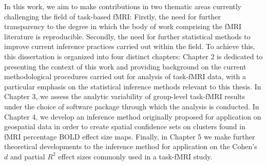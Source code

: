\noindent In this work, we aim to make contributions in two thematic areas currently challenging the field of task-based fMRI: Firstly, the need for further transparency to the degree in which the body of work comprising the fMRI literature is reproducible. Secondly, the need for further statistical methods to improve current inference practices carried out within the field. To achieve this, this dissertation is organized into four distinct chapters: Chapter 2 is dedicated to presenting the context of this work and providing background on the current methodological procedures carried out for analysis of task-fMRI data, with a particular emphasis on the statistical inference methods relevant to this thesis. In Chapter 3, we assess the analytic variability of group-level task-fMRI results under the choice of software package through which the analysis is conducted. In Chapter 4, we develop an inference method originally proposed for application on geospatial data in order to create spatial confidence sets on clusters found in fMRI percentage BOLD effect size maps. Finally, in Chapter 5 we make further theoretical developments to the inference method for application on the Cohen's $d$ and partial $R^{2}$ effect sizes commonly used in a task-fMRI study.  

